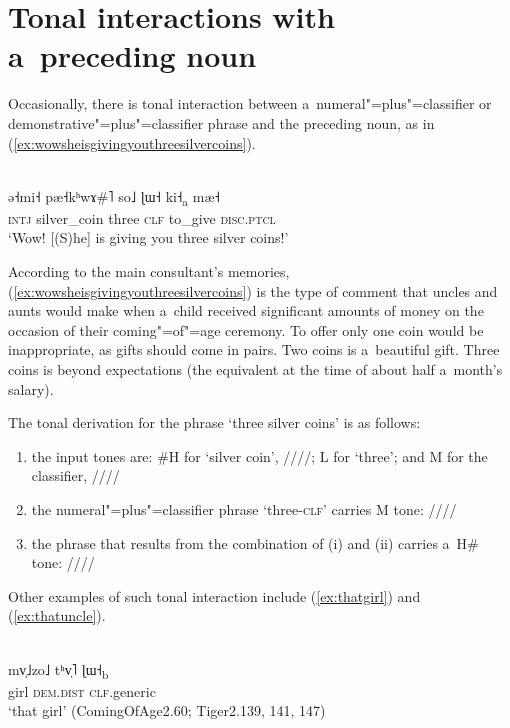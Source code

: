 \section{Tonal interactions with a~preceding noun}
\label{sec:interactionnoun}
\label{sec:introductioninteractionnoun}

Occasionally, there is tonal interaction between a~numeral"=plus"=classifier or
{\linebreak}demonstrative"=plus"=classifier phrase and the preceding noun, as in (\ref{ex:wowsheisgivingyouthreesilvercoins}). 
\begin{exe}
  \ex
  \\
  \label{ex:wowsheisgivingyouthreesilvercoins}
  \gll ə˧mi˧	pæ˧kʰwɤ\#˥	so˩	ɭɯ˧	ki˧\textsubscript{a}	mæ˧\\
  \textsc{intj}	silver\_coin	three	\textsc{clf}	to\_give	\textsc{disc}.\textsc{ptcl}\\
  \glt ‘Wow! [(S)he] is giving you three silver coins!’
\end{exe}

\newpage 
According to the main consultant's memories, (\ref{ex:wowsheisgivingyouthreesilvercoins}) is the
type of comment that uncles and aunts would make when a~child received significant amounts of money
on the occasion of their coming"=of"=age ceremony. To offer only one coin would be inappropriate, as
gifts should come in pairs. Two coins is a~beautiful gift. Three coins is beyond expectations (the equivalent at the time of about half a~month's salary).

The tonal derivation for the phrase ‘three silver coins’ is as follows: 
\begin{enumerate}[label=(\roman*), itemsep=0pt]
\item the input tones are: \#H for ‘silver coin’, ////; L for ‘three’; and M
  for the classifier, ////
\item the numeral"=plus"=classifier phrase ‘three-\textsc{clf}’ carries M tone: ////
\item the phrase that results from the combination of (i) and (ii) carries a~H\# tone: ////
\end{enumerate}

Other examples of such tonal interaction include (\ref{ex:thatgirl}) and (\ref{ex:thatuncle}).

\begin{exe}
	\ex
	\label{ex:thatgirl}
	\\
	\gll mv̩˩zo˩	tʰv̩˥	ɭɯ˧\textsubscript{b}\\
	 girl	\textsc{dem.dist}	\textsc{clf}.generic\\
	\glt ‘that girl’ (Coming\-Of\-Age2.60; Tiger2.139, 141, 147)
\end{exe}

